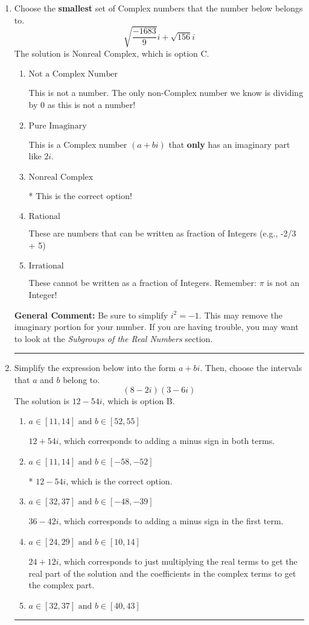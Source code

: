 \documentclass{extbook}[14pt]
\newcommand{\litem}[1]{\item #1

\rule{\textwidth}{0.4pt}}
\begin{document}
\begin{enumerate}\litem{
Choose the \textbf{smallest} set of Complex numbers that the number below belongs to.
\[ \sqrt{\frac{-1683}{9}} i+\sqrt{156}i \]The solution is \( \text{Nonreal Complex} \), which is option C.\begin{enumerate}[label=\Alph*.]
\item \( \text{Not a Complex Number} \)

This is not a number. The only non-Complex number we know is dividing by 0 as this is not a number!
\item \( \text{Pure Imaginary} \)

This is a Complex number $(a+bi)$ that \textbf{only} has an imaginary part like $2i$.
\item \( \text{Nonreal Complex} \)

* This is the correct option!
\item \( \text{Rational} \)

These are numbers that can be written as fraction of Integers (e.g., -2/3 + 5)
\item \( \text{Irrational} \)

These cannot be written as a fraction of Integers. Remember: $\pi$ is not an Integer!
\end{enumerate}

\textbf{General Comment:} Be sure to simplify $i^2 = -1$. This may remove the imaginary portion for your number. If you are having trouble, you may want to look at the \textit{Subgroups of the Real Numbers} section.
}
\litem{
Simplify the expression below into the form $a+bi$. Then, choose the intervals that $a$ and $b$ belong to.
\[ (8 - 2 i)(3 - 6 i) \]The solution is \( 12 - 54 i \), which is option B.\begin{enumerate}[label=\Alph*.]
\item \( a \in [11, 14] \text{ and } b \in [52, 55] \)

 $12 + 54 i$, which corresponds to adding a minus sign in both terms.
\item \( a \in [11, 14] \text{ and } b \in [-58, -52] \)

* $12 - 54 i$, which is the correct option.
\item \( a \in [32, 37] \text{ and } b \in [-48, -39] \)

 $36 - 42 i$, which corresponds to adding a minus sign in the first term.
\item \( a \in [24, 29] \text{ and } b \in [10, 14] \)

 $24 + 12 i$, which corresponds to just multiplying the real terms to get the real part of the solution and the coefficients in the complex terms to get the complex part.
\item \( a \in [32, 37] \text{ and } b \in [40, 43] \)


\end{enumerate}}
\end{enumerate}
\end{document}

